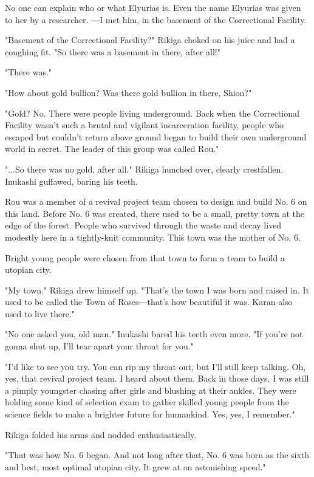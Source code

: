 No one can explain who or what Elyurias is. Even the name Elyurias was
given to her by a researcher. ―I met him, in the basement of the
Correctional Facility.

"Basement of the Correctional Facility?" Rikiga choked on his juice and
had a coughing fit. "So there was a basement in there, after all!"

"There was."

"How about gold bullion? Was there gold bullion in there, Shion?"

"Gold? No. There were people living underground. Back when the
Correctional Facility wasn't such a brutal and vigilant incarceration
facility, people who escaped but couldn't return above ground began to
build their own underground world in secret. The leader of this group
was called Rou."

"...So there was no gold, after all." Rikiga hunched over, clearly
crestfallen. Inukashi guffawed, baring his teeth.

Rou was a member of a revival project team chosen to design and build
No. 6 on this land. Before No. 6 was created, there used to be a small,
pretty town at the edge of the forest. People who survived through the
waste and decay lived modestly here in a tightly-knit community. This
town was the mother of No. 6.

Bright young people were chosen from that town to form a team to build a
utopian city.

"My town." Rikiga drew himself up. "That's the town I was born and
raised in. It used to be called the Town of Roses―that's how beautiful
it was. Karan also used to live there."

"No one asked you, old man." Inukashi bared his teeth even more. "If
you're not gonna shut up, I'll tear apart your throat for you."

"I'd like to see you try. You can rip my throat out, but I'll still keep
talking. Oh, yes, that revival project team. I heard about them. Back in
those days, I was still a pimply youngster chasing after girls and
blushing at their ankles. They were holding some kind of selection exam
to gather skilled young people from the science fields to make a
brighter future for humankind. Yes, yes, I remember."

Rikiga folded his arms and nodded enthusiastically.

"That was how No. 6 began. And not long after that, No. 6 was born as
the sixth and best, most optimal utopian city. It grew at an astonishing
speed."

